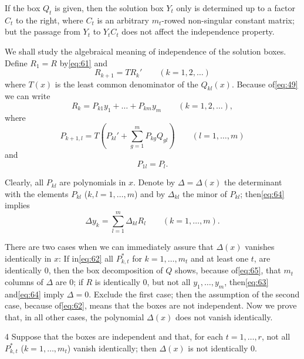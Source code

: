 If the box $Q_t$ is given, then the solution box $Y_t$ only is determined up to a factor $C_t$ to the right, where $C_t$ is an arbitrary $m_t$-rowed non-singular constant matrix; but the passage from $Y_t$ to $Y_t C_t$ does not affect the independence property.

We shall study the algebraical meaning of independence of the solution boxes. Define $R_1 = R$ by\eqref{eq:61} and
\begin{equation}
R_{k+1} = T R_k' \qquad (k=1,2,\dots) \tag{63}\label{eq:63}
\end{equation}
where $T(x)$ is the least common denominator of the $Q_{kl}(x)$. Because of\eqref{eq:49} we can write
\begin{equation}
R_{k} = P_{k1}y_{1} + \dots + P_{km}y_{m} \qquad (k=1,2,\dots), \tag{64}\label{eq:64}
\end{equation}
where
\begin{equation}
P_{k+1,l} = T \left( P_{kl}' + \sum_{g=1}^{m} P_{kg}Q_{gl} \right) \qquad (l=1,\dots,m) \tag{65}\label{eq:65}
\end{equation}
and
\begin{equation}
P_{1l} = P_l. \tag{66}\label{eq:66}
\end{equation}

Clearly, all $P_{kl}$ are polynomials in $x$. Denote by $\Delta = \Delta(x)$ the determinant with the elements $P_{kl}$ ($k,l=1,\dots,m$) and by $\Delta_{kl}$ the minor of $P_{kl}$; then\eqref{eq:64} implies
\begin{equation}
\Delta y_{k} = \sum_{l=1}^{m} \Delta_{kl} R_{l} \qquad (k=1,\dots,m). \tag{67}\label{eq:67}
\end{equation}

There are two cases when we can immediately assure that $\Delta(x)$ vanishes identically in $x$: If in\eqref{eq:62} all $P_{k,t}^*$ for $k=1,\dots,m_t$ and at least one $t$, are identically 0, then the box decomposition of $Q$ shows, because of\eqref{eq:65}, that $m_t$ columns of $\Delta$ are 0; if $R$ is identically 0, but not all $y_1, \dots, y_m$, then\eqref{eq:63} and\eqref{eq:64} imply $\Delta = 0$. Exclude the first case; then the assumption of the second case, because of\eqref{eq:62}, means that the boxes are not independent. Now we prove that, in all other cases, the polynomial $\Delta(x)$ does not vanish identically.

\begin{mylemma}{}{4}
Suppose that the boxes are independent and that, for each $t=1,\dots,r$, not all $P_{k,t}^*$ ($k=1,\dots,m_t$) vanish identically; then $\Delta(x)$ is not identically 0.
\end{mylemma}

